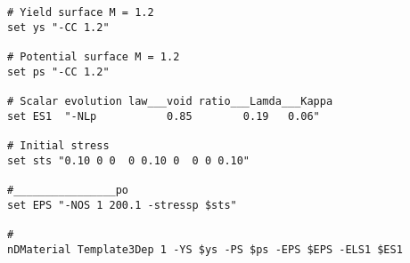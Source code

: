 \begin{small}
\begin{verbatim}
# Yield surface M = 1.2
set ys "-CC 1.2"

# Potential surface M = 1.2
set ps "-CC 1.2"

# Scalar evolution law___void ratio___Lamda___Kappa 
set ES1  "-NLp           0.85        0.19   0.06"

# Initial stress
set sts "0.10 0 0  0 0.10 0  0 0 0.10"

#________________po
set EPS "-NOS 1 200.1 -stressp $sts"

#
nDMaterial Template3Dep 1 -YS $ys -PS $ps -EPS $EPS -ELS1 $ES1

\end{verbatim}
\end{small}




